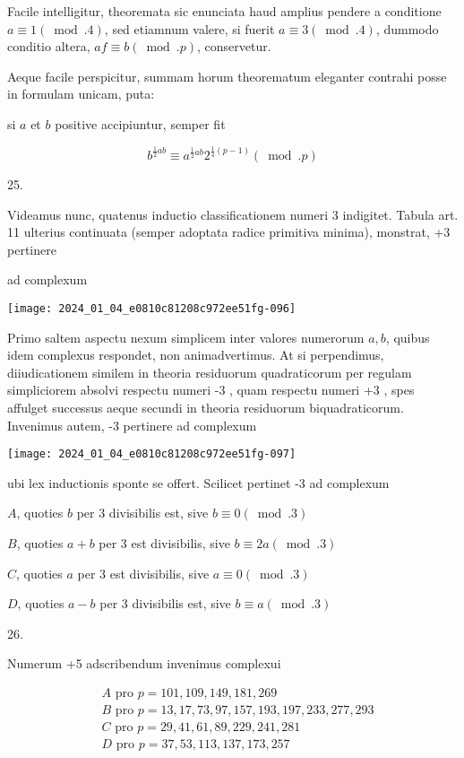 \documentclass[10pt]{article}
\begin{document}
Facile intelligitur, theoremata sic enunciata haud amplius pendere a conditione \(a \equiv 1(\bmod .4)\), sed etiamnum valere, si fuerit \(a \equiv 3(\bmod .4)\), dummodo conditio altera, \(a f \equiv b(\bmod . p)\), conservetur.

Aeque facile perspicitur, summam horum theorematum eleganter contrahi posse in formulam unicam, puta:

si \(a\) et \(b\) positive accipiuntur, semper fit

\[
b^{\frac{1}{2} a b} \equiv a^{\frac{1}{2} a b} 2^{\frac{1}{4}(p-1)}(\bmod . p)
\]

25.

Videamus nunc, quatenus inductio classificationem numeri 3 indigitet. Tabula art. 11 ulterius continuata (semper adoptata radice primitiva minima), monstrat, +3 pertinere

ad complexum

\begin{center}
\texttt{[image: 2024\_01\_04\_e0810c81208c972ee51fg-096]}
\end{center}

Primo saltem aspectu nexum simplicem inter valores numerorum \(a, b\), quibus idem complexus respondet, non animadvertimus. At si perpendimus, diiudicationem similem in theoria residuorum quadraticorum per regulam simpliciorem absolvi respectu numeri -3 , quam respectu numeri +3 , spes affulget successus aeque secundi in theoria residuorum biquadraticorum. Invenimus autem, -3 pertinere ad complexum

\begin{center}
\texttt{[image: 2024\_01\_04\_e0810c81208c972ee51fg-097]}
\end{center}

ubi lex inductionis sponte se offert. Scilicet pertinet -3 ad complexum

\(A\), quoties \(b\) per 3 divisibilis est, sive \(b \equiv 0(\bmod .3)\)

\(B\), quoties \(a+b\) per 3 est divisibilis, sive \(b \equiv 2 a(\bmod .3)\)

\(C\), quoties \(a\) per 3 est divisibilis, sive \(a \equiv 0(\bmod .3)\)

\(D\), quoties \(a-b\) per 3 divisibilis est, sive \(b \equiv a(\bmod .3)\)

26.

Numerum +5 adscribendum invenimus complexui

\[
\begin{aligned}
& A \text { pro } p=101,109,149,181,269 \\
& B \text { pro } p=13,17,73,97,157,193,197,233,277,293 \\
& C \text { pro } p=29,41,61,89,229,241,281 \\
& D \text { pro } p=37,53,113,137,173,257
\end{aligned}
\]
\end{document}
